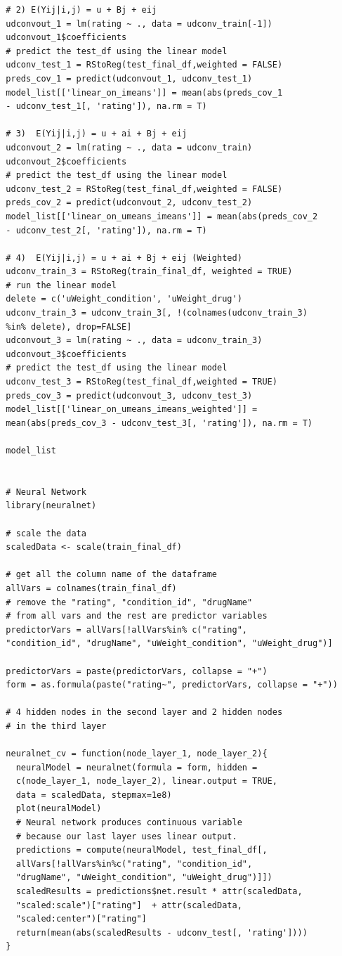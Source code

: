 \documentclass{article}
\begin{document}
\begin{verbatim}
  # 2) E(Yij|i,j) = u + Bj + eij
  udconvout_1 = lm(rating ~ ., data = udconv_train[-1])
  udconvout_1$coefficients
  # predict the test_df using the linear model
  udconv_test_1 = RStoReg(test_final_df,weighted = FALSE)
  preds_cov_1 = predict(udconvout_1, udconv_test_1)
  model_list[['linear_on_imeans']] = mean(abs(preds_cov_1 
  - udconv_test_1[, 'rating']), na.rm = T)

  # 3)	E(Yij|i,j) = u + ai + Bj + eij
  udconvout_2 = lm(rating ~ ., data = udconv_train)
  udconvout_2$coefficients
  # predict the test_df using the linear model
  udconv_test_2 = RStoReg(test_final_df,weighted = FALSE)
  preds_cov_2 = predict(udconvout_2, udconv_test_2)
  model_list[['linear_on_umeans_imeans']] = mean(abs(preds_cov_2 
  - udconv_test_2[, 'rating']), na.rm = T)

  # 4)	E(Yij|i,j) = u + ai + Bj + eij (Weighted)
  udconv_train_3 = RStoReg(train_final_df, weighted = TRUE)
  # run the linear model
  delete = c('uWeight_condition', 'uWeight_drug')
  udconv_train_3 = udconv_train_3[, !(colnames(udconv_train_3) 
  %in% delete), drop=FALSE]
  udconvout_3 = lm(rating ~ ., data = udconv_train_3)
  udconvout_3$coefficients
  # predict the test_df using the linear model
  udconv_test_3 = RStoReg(test_final_df,weighted = TRUE)
  preds_cov_3 = predict(udconvout_3, udconv_test_3)
  model_list[['linear_on_umeans_imeans_weighted']] = 
  mean(abs(preds_cov_3 - udconv_test_3[, 'rating']), na.rm = T)

  model_list


  # Neural Network
  library(neuralnet)

  # scale the data
  scaledData <- scale(train_final_df)

  # get all the column name of the dataframe
  allVars = colnames(train_final_df)
  # remove the "rating", "condition_id", "drugName" 
  # from all vars and the rest are predictor variables
  predictorVars = allVars[!allVars%in% c("rating", 
  "condition_id", "drugName", "uWeight_condition", "uWeight_drug")]

  predictorVars = paste(predictorVars, collapse = "+")
  form = as.formula(paste("rating~", predictorVars, collapse = "+"))

  # 4 hidden nodes in the second layer and 2 hidden nodes 
  # in the third layer

  neuralnet_cv = function(node_layer_1, node_layer_2){
    neuralModel = neuralnet(formula = form, hidden = 
    c(node_layer_1, node_layer_2), linear.output = TRUE, 
    data = scaledData, stepmax=1e8)
    plot(neuralModel)
    # Neural network produces continuous variable 
    # because our last layer uses linear output. 
    predictions = compute(neuralModel, test_final_df[, 
    allVars[!allVars%in%c("rating", "condition_id", 
    "drugName", "uWeight_condition", "uWeight_drug")]])
    scaledResults = predictions$net.result * attr(scaledData, 
    "scaled:scale")["rating"]  + attr(scaledData, 
    "scaled:center")["rating"]
    return(mean(abs(scaledResults - udconv_test[, 'rating'])))
  }


\end{verbatim}
\end{document}
